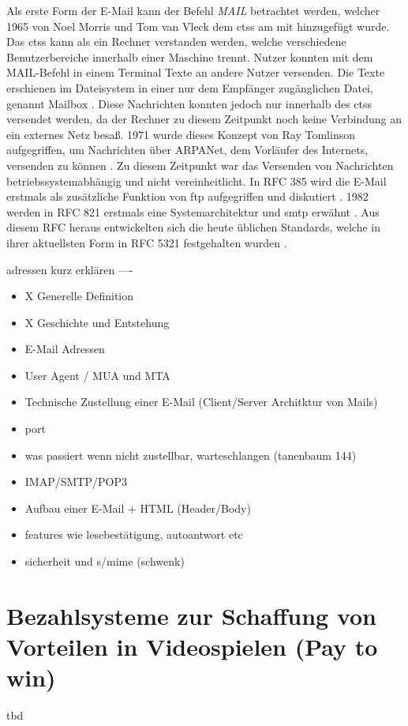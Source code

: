 Als erste Form der E-Mail kann der Befehl \textit{MAIL} betrachtet werden, welcher 1965 von Noel Morris und Tom van Vleck dem \acrfull{ctss} am \acrshort{mit} hinzugefügt wurde. Das \acrshort{ctss} kann als ein Rechner verstanden werden, welche verschiedene Benutzerbereiche innerhalb einer Maschine trennt. Nutzer konnten mit dem MAIL-Befehl in einem Terminal Texte an andere Nutzer versenden. Die Texte erschienen im Dateisystem in einer nur dem Empfänger zugänglichen Datei, genannt Mailbox \citep[S. 4]{Vleck2012}. Diese Nachrichten konnten jedoch nur innerhalb des \acrshort{ctss} versendet werden, da der Rechner zu diesem Zeitpunkt noch keine Verbindung an ein externes Netz besaß. 1971 wurde dieses Konzept von Ray Tomlinson aufgegriffen, um Nachrichten über ARPANet, dem Vorläufer des Internets, versenden zu können \citep[S. 4 ff.]{Partridge2008}. Zu diesem Zeitpunkt war das Versenden von Nachrichten betriebssystemabhängig und nicht vereinheitlicht. In RFC 385 wird die E-Mail erstmals als zusätzliche Funktion von \acrshort{ftp} aufgegriffen und diskutiert \citep[S. 3 f.]{RFC385}. 1982 werden in RFC 821 erstmals eine Systemarchitektur und \acrshort{smtp} erwähnt \citep[S. 2 ff.]{RFC821}. Aus diesem RFC heraus entwickelten sich die heute üblichen Standards, welche in ihrer aktuellsten Form in RFC 5321 festgehalten wurden \citep{RFC5321}.

adressen kurz erklären ----


\begin{itemize}
    \item X Generelle Definition
    \item X Geschichte und Entstehung
    \item E-Mail Adressen
    \item User Agent / MUA und MTA
    \item Technische Zustellung einer E-Mail (Client/Server Architktur von Mails)
    \item port
    \item was passiert wenn nicht zustellbar, warteschlangen (tanenbaum 144)
    \item IMAP/SMTP/POP3
    \item Aufbau einer E-Mail + HTML (Header/Body)
    \item features wie lesebestätigung, autoantwort etc
    \item sicherheit und s/mime (schwenk)
\end{itemize}


\section{Bezahlsysteme zur Schaffung von Vorteilen in Videospielen (Pay to win)}

tbd